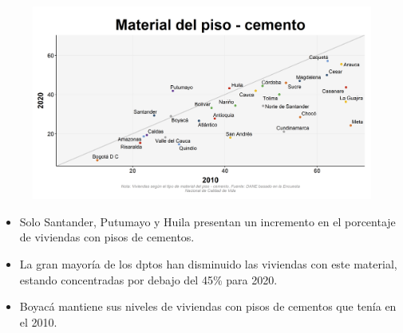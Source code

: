     \begin{figure}[H]
        \caption[Viviendas con piso de cemento por departamentos - 2010 VS 2020 ]{\label{piso_cemento_dptos_vs} }
        \begin{center}
        \includegraphics[width=\textwidth,keepaspectratio]{img/var_177_scatter_time.png}
        \end{center}
    \end{figure}
            \begin{itemize}
                    \item Solo Santander, Putumayo y Huila presentan un incremento en el porcentaje de viviendas con pisos de cementos.
                    \item La gran mayoría de los dptos han disminuido las viviendas con este material, estando concentradas por debajo del 45\% para 2020.
                    \item Boyacá mantiene sus niveles de viviendas con pisos de cementos que tenía en el 2010.
                    \end{itemize}

